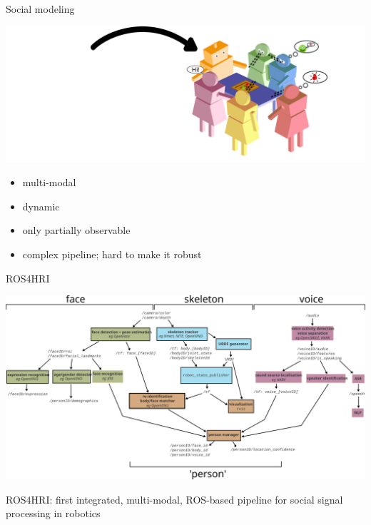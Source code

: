 \documentclass[xcolor=table]{beamer}
\begin{document}
{

\begin{frame}{Social modeling}
    \begin{center}
        \includegraphics[width=0.95\linewidth]{figs/social-interactions/social-complexity}
    \end{center}

     {
        \begin{itemize}
            \item multi-modal
            \item dynamic
            \item only partially observable
            \item complex pipeline; hard to make it robust
        \end{itemize}
    }

\end{frame}
}

{

\begin{frame}{ROS4HRI}
    \begin{center}
        \includegraphics[width=\columnwidth]{architectures/ros4hri-pipeline}
    \end{center}
    ROS4HRI: first integrated, multi-modal, ROS-based pipeline for social signal
    processing in robotics

\end{frame}
}
\end{document}
